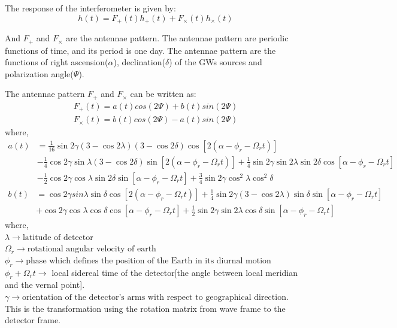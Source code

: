 \documentclass{ttuthes2007}
\begin{document}
The response of the interferometer is given by:
\begin{equation}
h(t) = F_+(t) h_+(t) + F_\times(t) h_\times(t) 
\end{equation}

And $F_+$ and $F_\times$ are the antennae pattern. The antennae pattern are periodic
functions of time, and its period is one day. The antennae pattern are the
functions of right ascension($\alpha$), declination($\delta$) of the \acp{GW}
sources and polarization angle($\Psi$). 

The antennae pattern $F_+$ and $F_\times$ can be written as:
\begin{align*}
F_+(t) = a(t)cos(2\Psi) + b(t) sin(2\Psi)\\
F_\times(t) = b(t)cos(2\Psi) - a(t) sin(2\Psi)
\end{align*}
where,
\begin{align*}\label{a}
a(t) &=
\frac{1}{16}\sin{2\gamma}(3-\cos{2\lambda})(3-\cos{2\delta})\cos{[2(\alpha-\phi_r-\Omega_rt)]}\\
&-\frac{1}{4}\cos{2\gamma} \sin{\lambda} (3-\cos{2\delta})
\sin{[2(\alpha-\phi_r-\Omega_rt)]}
+\frac{1}{4}\sin{2\gamma} \sin{2\lambda} \sin{2\delta}
\cos{[\alpha-\phi_r-\Omega_r t]} \\
&-\frac{1}{2}\cos{2\gamma} \cos{\lambda} \sin{2\delta}
\sin{[\alpha-\phi_r-\Omega_r t]}
+\frac{3}{4} \sin{2\gamma} \cos^2{\lambda} \cos^2{\delta}
\end{align*}
\begin{align*}
b(t)& =\cos{2\gamma} sin{\lambda} \sin{\delta} \cos{[2(\alpha-\phi_r-\Omega_r
t)]} +
\frac{1}{4} \sin{2\gamma} (3-\cos{2\lambda}) \sin{\delta}
\sin{[\alpha-\phi_r-\Omega_rt]}\\
&+ \cos{2\gamma} \cos{\lambda} \cos{\delta} \cos{[\alpha-\phi_r-\Omega_r t]} +
\frac{1}{2}\sin{2\gamma} \sin{2\lambda} \cos{\delta}
\sin{[\alpha-\phi_r-\Omega_rt]}
\end{align*}
where,\\
$\lambda \rightarrow \text{latitude of detector}$\\
$\Omega_r \rightarrow \text{rotational angular velocity of earth}$\\
$\phi_r \rightarrow \text{phase which defines the position of the Earth in its
diurnal motion}$\\
$\phi_r + \Omega_r t \rightarrow$ local sidereal time of the detector[the
angle between local meridian and the vernal point].\\
$\gamma \rightarrow \text{orientation of the detector's arms with respect to
geographical direction.}$\\
This is the transformation using the rotation matrix from wave frame to the
detector frame. 
\end{document}
